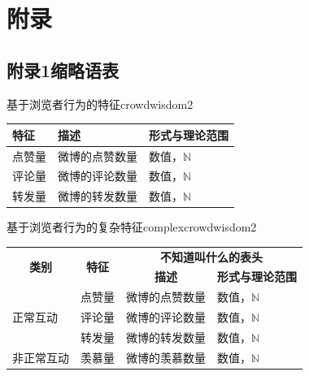\documentclass[a4paper,AutoFakeBold,oneside,12pt]{book}
\begin{document}
\setcounter{figure}{0} 
\renewcommand{\thefigure}{~附-\arabic{figure}~}
\setcounter{equation}{0} 
\renewcommand{\theequation}{~附-\arabic{equation}~}
\setcounter{table}{0} 
\renewcommand{\thetable}{~附-\arabic{table}~}
\setcounter{lstlisting}{0} 
\makeatletter
  \renewcommand \thelstlisting
       {附-\@arabic\c@lstlisting}
\makeatother


\chapter*{附\qquad{}录}

{}
\section*{附录1\quad{}缩略语表}

\begin{bupttable}{基于浏览者行为的特征}{crowdwisdom2}
    \begin{tabular}{l|l|l}
        \hline \textbf{特征} & \textbf{描述} & \textbf{形式与理论范围}\\
        \hline 点赞量 & 微博的点赞数量 & 数值，$\mathbb{N}$ \\
        \hline 评论量 & 微博的评论数量 & 数值，$\mathbb{N}$ \\
        \hline 转发量 & 微博的转发数量 & 数值，$\mathbb{N}$ \\
        \hline
    \end{tabular}
\end{bupttable}

\begin{bupttable}{基于浏览者行为的复杂特征}{complexcrowdwisdom2}
    \begin{tabular}{l|l|l|l}
		\hline
        \multicolumn{1}{c|}{\multirow{2}{*}{\textbf{类别}}} & \multicolumn{1}{c|}{\multirow{2}{*}{\textbf{特征}}} & \multicolumn{2}{c}{\textbf{不知道叫什么的表头}} \\
        \cline{3-4}
         & & \multicolumn{1}{c|}{\textbf{描述}} & \multicolumn{1}{c}{\textbf{形式与理论范围}} \\
		\hline
        \multirow{3}{*}{正常互动} & 点赞量 & 微博的点赞数量 & 数值，$\mathbb{N}$ \\
		\cline{2-4}
         & 评论量 & 微博的评论数量 & 数值，$\mathbb{N}$ \\
		\cline{2-4}
         & 转发量 & 微博的转发数量 & 数值，$\mathbb{N}$ \\
		\hline
        非正常互动 & 羡慕量 & 微博的羡慕数量 & 数值，$\mathbb{N}$ \\
        \hline
    \end{tabular}
\end{bupttable}
\end{document}
